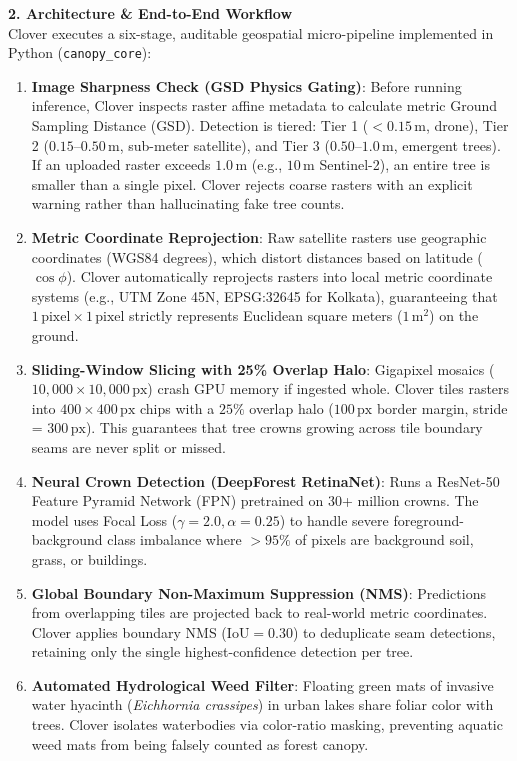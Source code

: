 \documentclass[10pt,a4paper]{article}
\begin{document}
\vspace{0.35em}
\noindent\textbf{\large 2. Architecture \& End-to-End Workflow}\\[0.25em]
Clover executes a six-stage, auditable geospatial micro-pipeline implemented in Python (\texttt{canopy\_core}):
\begin{enumerate}
    \item \textbf{Image Sharpness Check (GSD Physics Gating)}: Before running inference, Clover inspects raster affine metadata to calculate metric Ground Sampling Distance (GSD). Detection is tiered: Tier 1 ($<0.15\,\text{m}$, drone), Tier 2 ($0.15\text{--}0.50\,\text{m}$, sub-meter satellite), and Tier 3 ($0.50\text{--}1.0\,\text{m}$, emergent trees). If an uploaded raster exceeds $1.0\,\text{m}$ (e.g., $10\,\text{m}$ Sentinel-2), an entire tree is smaller than a single pixel. Clover rejects coarse rasters with an explicit warning rather than hallucinating fake tree counts.
    \item \textbf{Metric Coordinate Reprojection}: Raw satellite rasters use geographic coordinates (WGS84 degrees), which distort distances based on latitude ($\cos \phi$). Clover automatically reprojects rasters into local metric coordinate systems (e.g., UTM Zone 45N, EPSG:32645 for Kolkata), guaranteeing that $1\,\text{pixel} \times 1\,\text{pixel}$ strictly represents Euclidean square meters ($1\,\text{m}^2$) on the ground.
    \item \textbf{Sliding-Window Slicing with 25\% Overlap Halo}: Gigapixel mosaics ($10,000 \times 10,000\,\text{px}$) crash GPU memory if ingested whole. Clover tiles rasters into $400 \times 400\,\text{px}$ chips with a $25\%$ overlap halo ($100\,\text{px}$ border margin, stride = $300\,\text{px}$). This guarantees that tree crowns growing across tile boundary seams are never split or missed.
    \item \textbf{Neural Crown Detection (DeepForest RetinaNet)}: Runs a ResNet-50 Feature Pyramid Network (FPN) pretrained on 30+ million crowns. The model uses Focal Loss ($\gamma=2.0, \alpha=0.25$) to handle severe foreground-background class imbalance where $>95\%$ of pixels are background soil, grass, or buildings.
    \item \textbf{Global Boundary Non-Maximum Suppression (NMS)}: Predictions from overlapping tiles are projected back to real-world metric coordinates. Clover applies boundary NMS ($\text{IoU} = 0.30$) to deduplicate seam detections, retaining only the single highest-confidence detection per tree.
    \item \textbf{Automated Hydrological Weed Filter}: Floating green mats of invasive water hyacinth (\textit{Eichhornia crassipes}) in urban lakes share foliar color with trees. Clover isolates waterbodies via color-ratio masking, preventing aquatic weed mats from being falsely counted as forest canopy.
\end{enumerate}
\end{document}
